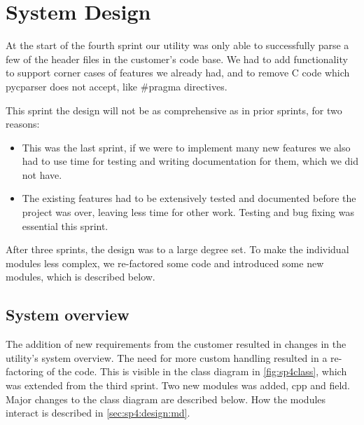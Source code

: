 \section{System Design}
\label{sec:sp4:design}
At the start of the fourth sprint our utility was only able to successfully
parse a few of the header files in the customer's code base. We had to add
functionality to support corner cases of features we already had, and to
remove C code which \gls{pycparser} does not accept, like \#pragma directives.

This sprint the design will not be as comprehensive as in prior sprints, for two reasons:
\begin{itemize}
	\item This was the last sprint, if we were to implement many new features we also had to use time for testing and writing documentation for them, which we did not have.
	\item The existing features had to be extensively tested and documented before the project was over, leaving less time for other work. Testing and bug fixing was essential this sprint.
\end{itemize}
After three sprints, the design was to a large degree set. To make the
individual modules less complex, we re-factored some code and introduced
some new modules, which is described below.

\subsection{System overview}
The addition of new requirements from the customer resulted in changes in the utility's system overview. The need for more custom handling resulted in a re-factoring of the code. This is visible in the class diagram in \autoref{fig:sp4class}, which was extended from the third sprint. Two new modules was added, cpp and field. Major changes to the class diagram are described below. How the modules interact is described in \autoref{sec:sp4:design:md}.

